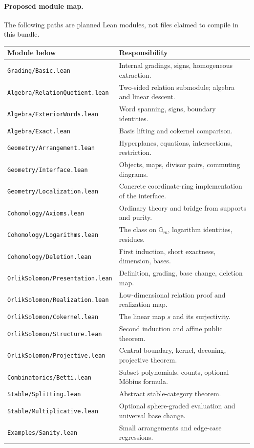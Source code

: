 \documentclass[11pt]{article}
\newcommand{\Gm}{{\mathbb G_m}}
\newcommand{\planned}[1]{\texttt{\detokenize{#1}}}
\theoremstyle{definition}
\theoremstyle{remark}
\begin{document}
\paragraph{Proposed module map.}
The following paths are planned Lean modules, not files claimed to compile in this bundle.
\begin{longtable}{@{}p{}p{}@{}}
\toprule
Module below \planned{ArrangementCohomology/} & Responsibility\\\midrule\endhead
\nolinkurl{Grading/Basic.lean} & Internal gradings, signs, homogeneous extraction.\\
\nolinkurl{Algebra/RelationQuotient.lean} & Two-sided relation submodule; algebra and linear descent.\\
\nolinkurl{Algebra/ExteriorWords.lean} & Word spanning, signs, boundary identities.\\
\nolinkurl{Algebra/Exact.lean} & Basis lifting and cokernel comparison.\\
\nolinkurl{Geometry/Arrangement.lean} & Hyperplanes, equations, intersections, restriction.\\
\nolinkurl{Geometry/Interface.lean} & Objects, maps, divisor pairs, commuting diagrams.\\
\nolinkurl{Geometry/Localization.lean} & Concrete coordinate-ring implementation of the interface.\\
\nolinkurl{Cohomology/Axioms.lean} & Ordinary theory and bridge from supports and purity.\\
\nolinkurl{Cohomology/Logarithms.lean} & The class on $\Gm$, logarithm identities, residues.\\
\nolinkurl{Cohomology/Deletion.lean} & First induction, short exactness, dimension, bases.\\
\nolinkurl{OrlikSolomon/Presentation.lean} & Definition, grading, base change, deletion map.\\
\nolinkurl{OrlikSolomon/Realization.lean} & Low-dimensional relation proof and realization map.\\
\nolinkurl{OrlikSolomon/Cokernel.lean} & The linear map $s$ and its surjectivity.\\
\nolinkurl{OrlikSolomon/Structure.lean} & Second induction and affine public theorem.\\
\nolinkurl{OrlikSolomon/Projective.lean} & Central boundary, kernel, deconing, projective theorem.\\
\nolinkurl{Combinatorics/Betti.lean} & Subset polynomials, counts, optional M\"obius formula.\\
\nolinkurl{Stable/Splitting.lean} & Abstract stable-category theorem.\\
\nolinkurl{Stable/Multiplicative.lean} & Optional sphere-graded evaluation and universal base change.\\
\nolinkurl{Examples/Sanity.lean} & Small arrangements and edge-case regressions.\\
\bottomrule
\end{longtable}
\end{document}
